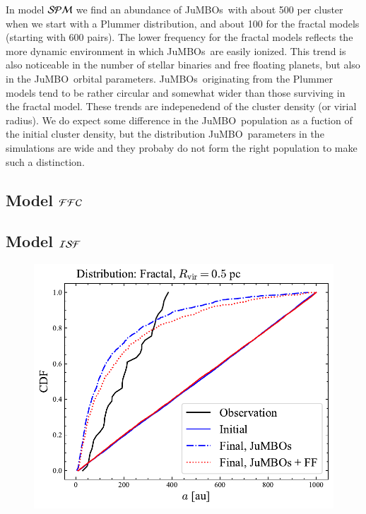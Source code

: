 \documentclass[aa]{lib/aa}
\newcommand{\jumbo}{\mbox{JuMBO}}
\newcommand{\jumbos}{\mbox{JuMBOs}}
\begin{document}
In model ${\cal SPM}$ we find an abundance of \jumbos\, with about 500
per cluster when we start with a Plummer distribution, and about 100
for the fractal models (starting with 600 pairs). The lower frequency
for the fractal models reflects the more dynamic environment in which
\jumbos\, are easily ionized. This trend is also noticeable in the
number of stellar binaries and free floating planets, but also in the
\jumbo\, orbital parameters. \jumbos\, originating from the Plummer
models tend to be rather circular and somewhat wider than those
surviving in the fractal model.  These trends are indepenedend of the
cluster density (or virial radius). We do expect some difference in
the \jumbo\, population as a fuction of the initial cluster density,
but the distribution \jumbo\, parameters in the simulations are wide
and they probaby do not form the right population to make such a
distinction.

\subsection{Model ${\cal FFC}$}


\subsection{Model ${\cal ISF}$}

\begin{figure}
    \centering
        \includegraphics[width=.91\columnwidth]{figures/sem_axis_Fractal_FF.pdf}
        \caption{}
         \label{Fig:Fr_semimajor_axis}
\end{figure}
\end{document}
